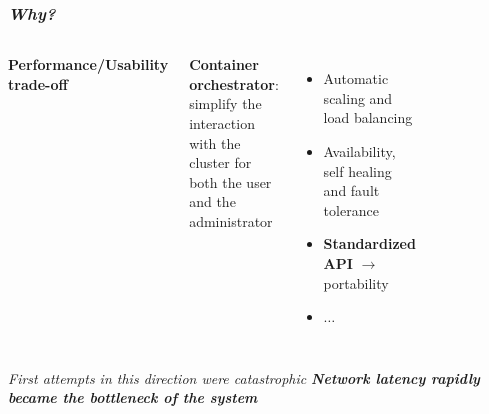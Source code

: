 \begin{frame}
  \frametitle{ \textit{Why?}}
  \begin{columns}
      \textbf{Performance/Usability trade-off}

     \alert{\textbf{Container orchestrator}}: simplify the interaction
         with the cluster for both the user and the administrator
       \begin{itemize}
         \itemsep0em
         \item Automatic scaling and load balancing
         \item Availability, self healing and fault tolerance
         \item \alert{\textbf{Standardized API}} $\to$ portability
         \item $\dots$
       \end{itemize}
     \begin{figure}
       \centering
       \includegraphics[width=0.75\textwidth]{img/logos/kubernetes-logo}
    \end{figure}
  \end{columns}
   \vfill
   \pause

  \begin{block}{ \textit{First attempts in this
        direction were catastrophic}}
    \centering
    \large
    \textbf{\textit{
         Network latency rapidly became the bottleneck
        of the system
        }}
  \end{block}
\end{frame}

